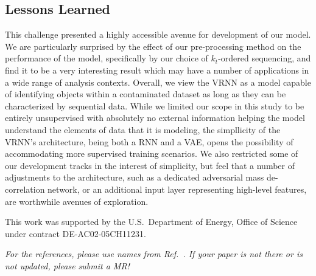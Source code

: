 \documentclass[letterpaper,11pt]{article}
\begin{document}
\subsection{Lessons Learned}
\label{sec:lessons}


This challenge presented a highly accessible avenue for development of our model. We are particularly surprised by the effect of our pre-processing method on the performance of the model, specifically by our choice of $k_{t}$-ordered sequencing, and find it to be a very interesting result which may have a number of applications in a wide range of analysis contexts. Overall, we view the VRNN as a model capable of identifying objects within a contaminated dataset as long as they can be characterized by sequential data. While we limited our scope in this study to be entirely unsupervised with absolutely no external information helping the model understand the elements of data that it is modeling, the simpllicity of the VRNN's architecture, being both a RNN and a VAE, opens the possibility of accommodating more supervised training scenarios. We also restricted some of our development tracks in the interest of simplicity, but feel that a number of adjustments to the architecture, such as a dedicated adversarial mass de-correlation network, or an additional input layer representing high-level features, are worthwhile avenues of exploration.



\acknowledgments

This work was supported by the U.S.~Department of Energy, Office of Science under contract DE-AC02-05CH11231. 

\vspace{10mm}

\noindent \textit{For the references, please use names from Ref.~\cite{hepmllivingreview}.  If your paper is not there or is not updated, please submit a MR!}



\end{document}
